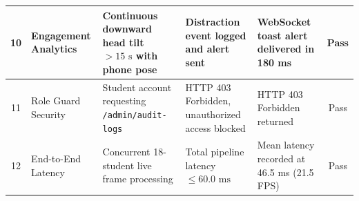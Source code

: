 \begin{table}[h]
\begin{tabular}{|c|p{2.2cm}|p{2.6cm}|p{3.2cm}|p{2.8cm}|c|}
\hline
10 & Engagement Analytics & Continuous downward head tilt $> 15\text{ s}$ with phone pose & Distraction event logged and alert sent & WebSocket toast alert delivered in 180 ms & Pass \\
\hline
11 & Role Guard Security & Student account requesting \texttt{/admin/audit-logs} & HTTP 403 Forbidden, unauthorized access blocked & HTTP 403 Forbidden returned & Pass \\
\hline
12 & End-to-End Latency & Concurrent 18-student live frame processing & Total pipeline latency $\le 60.0\text{ ms}$ & Mean latency recorded at 46.5 ms (21.5 FPS) & Pass \\
\hline
\end{tabular}
\end{table}
\newpage
